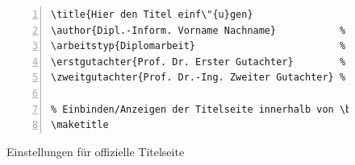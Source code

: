 \begin{figure}[ht]
\centering
\begin{Verbatim}[label=dissertation.tex,numberblanklines=false,fontsize=\scriptsize,numbers=left,frame=single]
% Voreinstellungen f\"{u}r offizielle Titelseite
\title{Hier den Titel einf\"{u}gen}                   % Titel der Dissertation
\author{Dipl.-Inform. Vorname Nachname}           % Name des Autors
\arbeitstyp{Diplomarbeit}                         % oder Bachelorarbeit, Masterarbeit ...
\erstgutachter{Prof. Dr. Erster Gutachter}        % Name des Erstgutachters
\zweitgutachter{Prof. Dr.-Ing. Zweiter Gutachter} % Name des Zweitgutachters

% Einbinden/Anzeigen der Titelseite innerhalb von \begin/end{document}
\maketitle
\end{Verbatim}
\caption{Einstellungen f\"{u}r offizielle Titelseite}\label{titelseite}
\end{figure}
